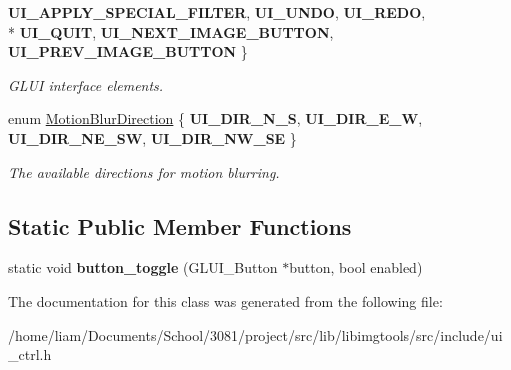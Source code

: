\begin{DoxyCompactItemize}
{\bfseries U\+I\+\_\+\+A\+P\+P\+L\+Y\+\_\+\+S\+P\+E\+C\+I\+A\+L\+\_\+\+F\+I\+L\+T\+ER}, 
{\bfseries U\+I\+\_\+\+U\+N\+DO}, 
{\bfseries U\+I\+\_\+\+R\+E\+DO}, 
\\*
{\bfseries U\+I\+\_\+\+Q\+U\+IT}, 
{\bfseries U\+I\+\_\+\+N\+E\+X\+T\+\_\+\+I\+M\+A\+G\+E\+\_\+\+B\+U\+T\+T\+ON}, 
{\bfseries U\+I\+\_\+\+P\+R\+E\+V\+\_\+\+I\+M\+A\+G\+E\+\_\+\+B\+U\+T\+T\+ON}
 \}\hypertarget{classimage__tools_1_1UICtrl_a94c1180d7f5541b2d52d0f56ff6dfbd6}{}\label{classimage__tools_1_1UICtrl_a94c1180d7f5541b2d52d0f56ff6dfbd6}
\begin{DoxyCompactList}\small\item\em G\+L\+UI interface elements. \end{DoxyCompactList}
\item 
enum \hyperlink{classimage__tools_1_1UICtrl_a56d4f68bf91302769d7bc453d8d57cee}{Motion\+Blur\+Direction} \{ {\bfseries U\+I\+\_\+\+D\+I\+R\+\_\+\+N\+\_\+S}, 
{\bfseries U\+I\+\_\+\+D\+I\+R\+\_\+\+E\+\_\+W}, 
{\bfseries U\+I\+\_\+\+D\+I\+R\+\_\+\+N\+E\+\_\+\+SW}, 
{\bfseries U\+I\+\_\+\+D\+I\+R\+\_\+\+N\+W\+\_\+\+SE}
 \}\hypertarget{classimage__tools_1_1UICtrl_a56d4f68bf91302769d7bc453d8d57cee}{}\label{classimage__tools_1_1UICtrl_a56d4f68bf91302769d7bc453d8d57cee}
\begin{DoxyCompactList}\small\item\em The available directions for motion blurring. \end{DoxyCompactList}
\end{DoxyCompactItemize}
\subsection*{Static Public Member Functions}
\begin{DoxyCompactItemize}
\item 
static void {\bfseries button\+\_\+toggle} (G\+L\+U\+I\+\_\+\+Button $\ast$button, bool enabled)\hypertarget{classimage__tools_1_1UICtrl_ab69f0e1ea369485305d87820b61e1a50}{}\label{classimage__tools_1_1UICtrl_ab69f0e1ea369485305d87820b61e1a50}

\end{DoxyCompactItemize}


The documentation for this class was generated from the following file\+:\begin{DoxyCompactItemize}
\item 
/home/liam/\+Documents/\+School/3081/project/src/lib/libimgtools/src/include/ui\+\_\+ctrl.\+h\end{DoxyCompactItemize}
